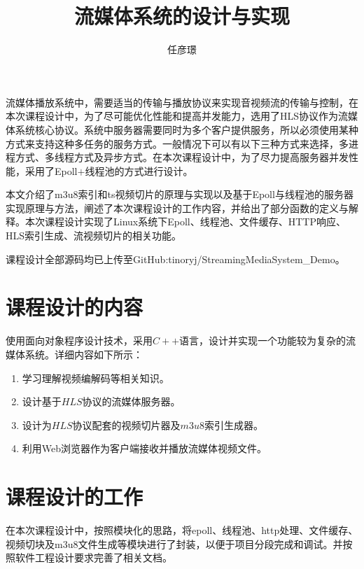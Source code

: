 \documentclass[bachelor]{thesis-uestc}
\title{流媒体系统的设计与实现}
\author{任彦璟}
\begin{document}
\begin{chineseabstract}

流媒体播放系统中，需要适当的传输与播放协议来实现音视频流的传输与控制，在本次课程设计中，为了尽可能优化性能和提高并发能力，选用了HLS协议作为流媒体系统核心协议。系统中服务器需要同时为多个客户提供服务，所以必须使用某种方式来支持这种多任务的服务方式。一般情况下可以有以下三种方式来选择，多进程方式、多线程方式及异步方式。在本次课程设计中，为了尽力提高服务器并发性能，采用了Epoll$+$线程池的方式进行设计。

本文介绍了m3u8索引和ts视频切片的原理与实现以及基于Epoll与线程池的服务器实现原理与方法，阐述了本次课程设计的工作内容，并给出了部分函数的定义与解释。本次课程设计实现了Linux系统下Epoll、线程池、文件缓存、HTTP响应、HLS索引生成、流视频切片的相关功能。

课程设计全部源码均已上传至GitHub:tinoryj/StreamingMediaSystem\_Demo。



\end{chineseabstract}

\thesistableofcontents

\thesischapterexordium

\section{课程设计的内容}

使用面向对象程序设计技术，采用$C++$语言，设计并实现一个功能较为复杂的流媒体系统。详细内容如下所示：

\begin{enumerate}
	\item 学习理解视频编解码等相关知识。
	\item 设计基于$HLS$协议的流媒体服务器。
	\item 设计为$HLS$协议配套的视频切片器及$m3u8$索引生成器。
	\item 利用Web浏览器作为客户端接收并播放流媒体视频文件。

\end{enumerate}


\section{课程设计的工作}

在本次课程设计中，按照模块化的思路，将epoll、线程池、http处理、文件缓存、视频切块及m3u8文件生成等模块进行了封装，以便于项目分段完成和调试。并按照软件工程设计要求完善了相关文档。
\end{document}
